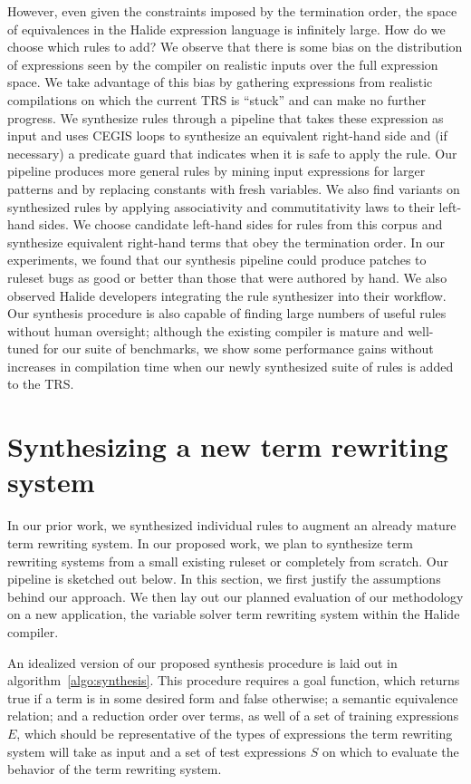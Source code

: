 However, even
given the constraints imposed by the termination order, the space of equivalences 
in the Halide expression language is infinitely large. How do we choose which  
rules to add? We observe that there is some bias on the distribution of expressions 
seen by the compiler on realistic inputs over the full expression space. We take advantage 
of this bias by gathering expressions from realistic compilations on which the current 
TRS is ``stuck'' and can make no further progress. We synthesize rules through a pipeline that takes these expression as input and uses CEGIS loops to synthesize an equivalent right-hand side and (if necessary) a predicate guard that indicates when it is safe to apply 
the rule. Our pipeline produces more general rules by mining input expressions for larger patterns and by replacing constants with fresh variables. We also find variants on synthesized rules by applying associativity and commutitativity laws to their left-hand sides. We choose candidate left-hand sides 
for rules from this corpus and synthesize equivalent right-hand terms that obey the 
termination order. In our experiments, we found that our synthesis pipeline could produce patches to ruleset bugs as good or better than those that were authored by hand. We also observed Halide developers integrating the rule synthesizer into their workflow. Our synthesis procedure is also capable of finding large numbers of useful rules without
human oversight; although the existing compiler is mature 
and well-tuned for our suite of benchmarks, we show some performance 
gains without increases in compilation time when our newly synthesized suite 
of rules is added to the TRS. 

 

\section{Synthesizing a new term rewriting system}
\label{proposed}


In our prior work, we synthesized individual rules to augment an already mature term rewriting system. In our proposed work, we plan to synthesize term rewriting systems from a small existing ruleset or completely from scratch. Our pipeline is sketched out below. In this section, we first justify the assumptions behind our approach. We then lay out our planned evaluation of our methodology on a new application, the variable solver term rewriting system within the Halide compiler.

An idealized version of our proposed synthesis procedure is laid out in algorithm~\ref{algo:synthesis}. This procedure requires a goal function, which returns true if a term is in some desired form and false otherwise; a semantic equivalence relation; and a reduction order over terms, as well of a set of training expressions $E$, which should be representative of the types of expressions the term rewriting system will take as input and a set of test expressions $S$ on which to evaluate the behavior of the term rewriting system.



